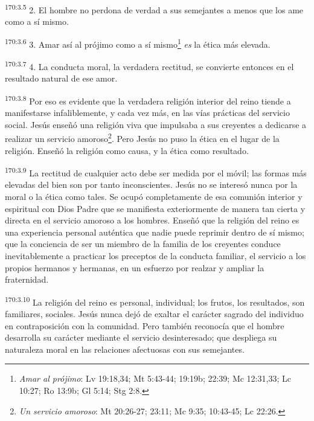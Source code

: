 \par 
\textsuperscript{170:3.5} 2. El hombre no perdona de verdad a sus semejantes a menos que los ame como a sí mismo.

\par 
\textsuperscript{170:3.6} 3. Amar así al prójimo como a sí mismo\footnote{\textit{Amar al prójimo}: Lv 19:18,34; Mt 5:43-44; 19:19b; 22:39; Mc 12:31,33; Lc 10:27; Ro 13:9b; Gl 5:14; Stg 2:8.} \textit{es} la ética más elevada.

\par 
\textsuperscript{170:3.7} 4. La conducta moral, la verdadera rectitud, se convierte entonces en el resultado natural de ese amor.

\par 
\textsuperscript{170:3.8} Por eso es evidente que la verdadera religión interior del reino tiende a manifestarse infaliblemente, y cada vez más, en las vías prácticas del servicio social. Jesús enseñó una religión viva que impulsaba a sus creyentes a dedicarse a realizar un servicio amoroso\footnote{\textit{Un servicio amoroso}: Mt 20:26-27; 23:11; Mc 9:35; 10:43-45; Lc 22:26.}. Pero Jesús no puso la ética en el lugar de la religión. Enseñó la religión como causa, y la ética como resultado.

\par 
\textsuperscript{170:3.9} La rectitud de cualquier acto debe ser medida por el móvil; las formas más elevadas del bien son por tanto inconscientes. Jesús no se interesó nunca por la moral o la ética como tales. Se ocupó completamente de esa comunión interior y espiritual con Dios Padre que se manifiesta exteriormente de manera tan cierta y directa en el servicio amoroso a los hombres. Enseñó que la religión del reino es una experiencia personal auténtica que nadie puede reprimir dentro de sí mismo; que la conciencia de ser un miembro de la familia de los creyentes conduce inevitablemente a practicar los preceptos de la conducta familiar, el servicio a los propios hermanos y hermanas, en un esfuerzo por realzar y ampliar la fraternidad.

\par 
\textsuperscript{170:3.10} La religión del reino es personal, individual; los frutos, los resultados, son familiares, sociales. Jesús nunca dejó de exaltar el carácter sagrado del individuo en contraposición con la comunidad. Pero también reconocía que el hombre desarrolla su carácter mediante el servicio desinteresado; que despliega su naturaleza moral en las relaciones afectuosas con sus semejantes.

